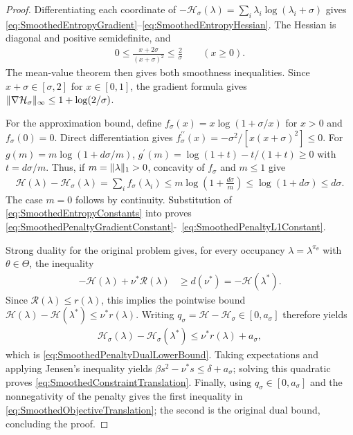 \documentclass{article}
\theoremstyle{plain}
\theoremstyle{definition}
\theoremstyle{remark}
\DeclarePairedDelimiter{\norm}{\lVert}{\rVert}
\def\nuOpt{{\nu^{*}}}
\def\HH{{\mathcal{H}}}
\def\Reg{{\mathcal{R}}}
\begin{document}
\begin{proof}
 Differentiating each coordinate of
 $-\HH_\sigma(\lambda)=\sum_i\lambda_i\log(\lambda_i+\sigma)$ gives
 \eqref{eq:SmoothedEntropyGradient}--\eqref{eq:SmoothedEntropyHessian}.
 The Hessian is diagonal and positive semidefinite, and
 \begin{align*}
  0\leq\frac{x+2\sigma}{(x+\sigma)^2}\leq\frac{2}{\sigma}
  \qquad(x\geq0).
 \end{align*}
 The mean-value theorem then gives both smoothness inequalities.
 Since $x+\sigma\in[\sigma,2]$ for $x\in[0,1]$, the gradient formula gives
 $\norm{\nabla\HH_\sigma}_\infty\leq1+\log(2/\sigma)$.

 For the approximation bound, define $f_\sigma(x)=x\log(1+\sigma/x)$ for
 $x>0$ and $f_\sigma(0)=0$. Direct differentiation gives
 $f_\sigma^{\prime\prime}(x)=-\sigma^2/[x(x+\sigma)^2]\leq0$. For
 $g(m)=m\log(1+d\sigma/m)$, $g^{\prime}(m)=\log(1+t)-t/(1+t)\geq0$ with
 $t=d\sigma/m$. Thus, if $m=\norm{\lambda}_1>0$, concavity of $f_\sigma$ and
 $m\leq1$ give
 \begin{align*}
  \HH(\lambda)-\HH_\sigma(\lambda)
  =\sum_i f_\sigma(\lambda_i)
  \leq m\log\left(1+\frac{d\sigma}{m}\right)
  \leq\log(1+d\sigma)\leq d\sigma.
 \end{align*}
 The case $m=0$ follows by continuity. Substitution of
 \eqref{eq:SmoothedEntropyConstants} into
  proves
 \mbox{\eqref{eq:SmoothedPenaltyGradientConstant}-
  \eqref{eq:SmoothedPenaltyL1Constant}}.

 Strong duality for the original problem gives, for every occupancy
 $\lambda=\lambda^{\pi_\theta}$ with $\theta\in\Theta$, the inequality
 \begin{align*}
  -\HH(\lambda)+\nuOpt\Reg(\lambda)
   & \geq d(\nuOpt)=-\HH(\lambda^*).
 \end{align*}
 Since $\Reg(\lambda)\leq r(\lambda)$, this implies the pointwise
 bound $\HH(\lambda)-\HH(\lambda^*)\leq\nuOpt r(\lambda)$.
 Writing $q_\sigma=\HH-\HH_\sigma\in[0,a_\sigma]$ therefore yields
 \begin{align*}
  \HH_\sigma(\lambda)-\HH_\sigma(\lambda^*)
  \leq\nuOpt r(\lambda)+a_\sigma,
 \end{align*}
 which is \eqref{eq:SmoothedPenaltyDualLowerBound}. Taking
 expectations and applying Jensen's inequality yields
 $\beta s^2-\nuOpt s\leq\delta+a_\sigma$; solving this quadratic proves
 \eqref{eq:SmoothedConstraintTranslation}. Finally, using
 $q_\sigma\in[0,a_\sigma]$ and the nonnegativity of the penalty gives the
 first inequality in \eqref{eq:SmoothedObjectiveTranslation}; the second
 is the original dual bound, concluding the proof.
\end{proof}
\end{document}
